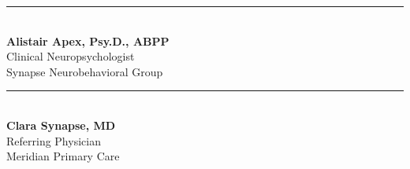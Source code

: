 \vspace{1.0cm}
\noindent
\begin{minipage}[t]{0.49\textwidth}
    \rule{6cm}{0.5pt} \\
    \textbf{Alistair Apex, Psy.D., ABPP} \\
    Clinical Neuropsychologist \\
    Synapse Neurobehavioral Group
\end{minipage}%
\hfill
\begin{minipage}[t]{0.49\textwidth}
    \rule{6cm}{0.5pt} \\
    \textbf{Clara Synapse, MD} \\
    Referring Physician \\
    Meridian Primary Care
\end{minipage}
